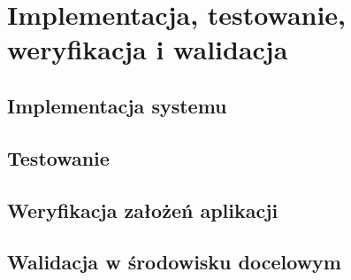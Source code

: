 \chapter{Implementacja, testowanie, weryfikacja i walidacja}
\label{chap:project implementation}

\section{Implementacja systemu}

\section{Testowanie}

\section{Weryfikacja założeń aplikacji}

\section{Walidacja w środowisku docelowym}